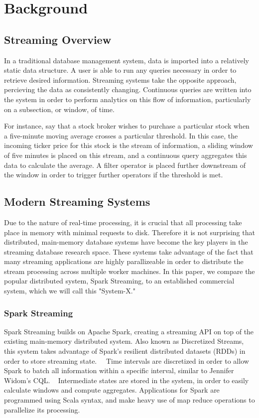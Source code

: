 \section{Background}
\subsection{Streaming Overview}
In a traditional database management system, data is imported into a relatively static data structure.  A user is able to run any queries necessary in order to retrieve desired information.  Streaming systems take the opposite approach, percieving the data as consistently changing.  Continuous queries are written into the system in order to perform analytics on this flow of information, particularly on a subsection, or window, of time.~\cite{aurora}

For instance, say that a stock broker wishes to purchase a particular stock when a five-minute moving average crosses a particular threshold.  In this case, the incoming ticker price for this stock is the stream of information, a sliding window of five minutes is placed on this stream, and a continuous query aggregates this data to calculate the average.  A filter operator is placed further downstream of the window in order to trigger further operators if the threshold is met.

\subsection{Modern Streaming Systems}
Due to the nature of real-time processing, it is crucial that all processing take place in memory with minimal requests to disk.  Therefore it is not surprising that distributed, main-memory database systems have become the key players in the streaming database research space.  These systems take advantage of the fact that many streaming applications are highly parallizeable in order to distribute the stream processing across multiple worker machines.  In this paper, we compare the popular distributed system, Spark Streaming, to an established commercial system, which we will call this "System-X."

\subsubsection{Spark Streaming}
Spark Streaming builds on Apache Spark, creating a streaming API on top of the existing main-memory distributed system.  Also known as Discretized Streams, this system takes advantage of Spark's resilient distributed datasets (RDDs) in order to store streaming state.~\cite{dstreams}~\cite{rdd}  Time intervals are discretized in order to allow Spark to batch all information within a specific interval, similar to Jennifer Widom's CQL. ~\cite{cql}  Intermediate states are stored in the system, in order to easily calculate windows and compute aggregates.  Applications for Spark are programmed using Scala syntax, and make heavy use of map reduce operations to parallelize its processing.


